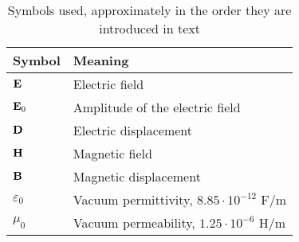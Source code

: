 \begin{table}[ht]   \caption{Symbols used, approximately in the order they are introduced in text}  \label{tb_symbols} \centering %
\begin{tabular}{ll}
 \toprule
Symbol & Meaning	\\
 \hline
$\mathbf{E}$ 		& Electric field\\
$\mathbf{E}_0$ 		& Amplitude of the electric field\\
$\mathbf{D}$ 		& Electric displacement\\
$\mathbf{H}$ 		& Magnetic field\\
$\mathbf{B}$ 		& Magnetic displacement									\vspace{3mm}\\
 
$\varepsilon_0$ &Vacuum permittivity, $8.85\cdot10^{-12}$ F/m\\
$\mu_0$		&Vacuum permeability, $1.25\cdot10^{-6}$ H/m			\vspace{3mm}\\
 

\end{tabular}
\end{table}
